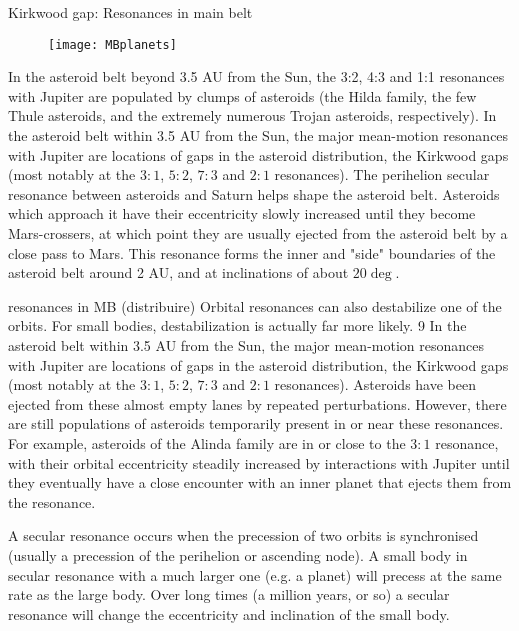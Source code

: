 \begin{frame}{Kirkwood gap: Resonances in main belt}
\begin{figure}[!ht]\texttt{[image: MBplanets]}
\end{figure}
In the asteroid belt beyond 3.5 AU from the Sun, the 3:2, 4:3 and 1:1 resonances with Jupiter are populated by clumps of asteroids (the Hilda family, the few Thule asteroids, and the extremely numerous Trojan asteroids, respectively).
In the asteroid belt within 3.5 AU from the Sun, the major mean-motion resonances with Jupiter are locations of gaps in the asteroid distribution, the Kirkwood gaps (most notably at the $3:1$, $5:2$, $7:3$ and $2:1$ resonances).
The perihelion secular resonance between asteroids and Saturn  helps shape the asteroid belt. Asteroids which approach it have their eccentricity slowly increased until they become Mars-crossers, at which point they are usually ejected from the asteroid belt by a close pass to Mars. This resonance forms the inner and "side" boundaries of the asteroid belt around 2 AU, and at inclinations of about $20\deg$.

\end{frame}


\begin{wordonframe}{resonances in MB (distribuire)}
Orbital resonances can also destabilize one of the orbits. For small bodies, destabilization is actually far more likely.
9
In the asteroid belt within 3.5 AU from the Sun, the major mean-motion resonances with Jupiter are locations of gaps in the asteroid distribution, the Kirkwood gaps (most notably at the $3:1$, $5:2$, $7:3$ and $2:1$ resonances). Asteroids have been ejected from these almost empty lanes by repeated perturbations. However, there are still populations of asteroids temporarily present in or near these resonances. For example, asteroids of the Alinda family are in or close to the $3:1$ resonance, with their orbital eccentricity steadily increased by interactions with Jupiter until they eventually have a close encounter with an inner planet that ejects them from the resonance.

A secular resonance occurs when the precession of two orbits is synchronised (usually a precession of the perihelion or ascending node). A small body in secular resonance with a much larger one (e.g. a planet) will precess at the same rate as the large body. Over long times (a million years, or so) a secular resonance will change the eccentricity and inclination of the small body.
\end{wordonframe}

